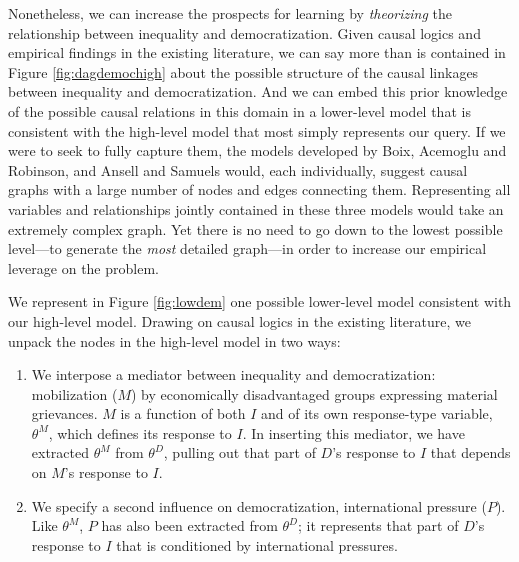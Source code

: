 \documentclass[12pt,]{book}
\begin{document}
Nonetheless, we can increase the prospects for learning by \emph{theorizing} the relationship between inequality and democratization. Given causal logics and empirical findings in the existing literature, we can say more than is contained in Figure \ref{fig:dagdemochigh} about the possible structure of the causal linkages between inequality and democratization. And we can embed this prior knowledge of the possible causal relations in this domain in a lower-level model that is consistent with the high-level model that most simply represents our query. If we were to seek to fully capture them, the models developed by Boix, Acemoglu and Robinson, and Ansell and Samuels would, each individually, suggest causal graphs with a large number of nodes and edges connecting them. Representing all variables and relationships jointly contained in these three models would take an extremely complex graph. Yet there is no need to go down to the lowest possible level---to generate the \emph{most} detailed graph---in order to increase our empirical leverage on the problem.

We represent in Figure \ref{fig:lowdem} one possible lower-level model consistent with our high-level model. Drawing on causal logics in the existing literature, we unpack the nodes in the high-level model in two ways:

\begin{enumerate}
\def\labelenumi{\arabic{enumi}.}
\item
  We interpose a mediator between inequality and democratization: mobilization (\(M\)) by economically disadvantaged groups expressing material grievances. \(M\) is a function of both \(I\) and of its own response-type variable, \(\theta^M\), which defines its response to \(I\). In inserting this mediator, we have extracted \(\theta^M\) from \(\theta^D\), pulling out that part of \(D\)'s response to \(I\) that depends on \(M\)'s response to \(I\).
\item
  We specify a second influence on democratization, international pressure (\(P\)). Like \(\theta^M\), \(P\) has also been extracted from \(\theta^D\); it represents that part of \(D\)'s response to \(I\) that is conditioned by international pressures.
\end{enumerate}
\end{document}
